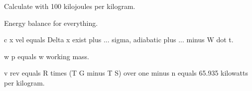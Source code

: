 Calculate with 100 kilojoules per kilogram.

Energy balance for everything.

c x vel equals Delta x exist plus ... sigma, adiabatic plus ... minus W dot t.

w p equals w working mass.

v rev equals R times (T G minus T S) over one minus n equals 65.935 kilowatts per kilogram.